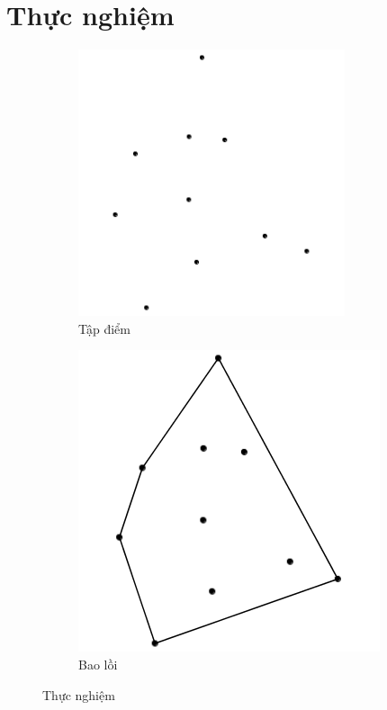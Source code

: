 \documentclass[12pt]{article}
\begin{document}
    \section{Thực nghiệm} 
        \begin{figure}
          \centering
          \begin{subfigure}[h]{0.4\linewidth}
            \includegraphics[width=\linewidth]{Image/randPoint}
            \caption{Tập điểm}
            \label{fig: points}
          \end{subfigure}
          \begin{subfigure}[h]{0.4\linewidth}
            \includegraphics[width=\linewidth]{Image/polych}
            \caption{Bao lồi}
            \label{fig: polych}
          \end{subfigure}
          \caption{Thực nghiệm}
        \end{figure}
\end{document}
